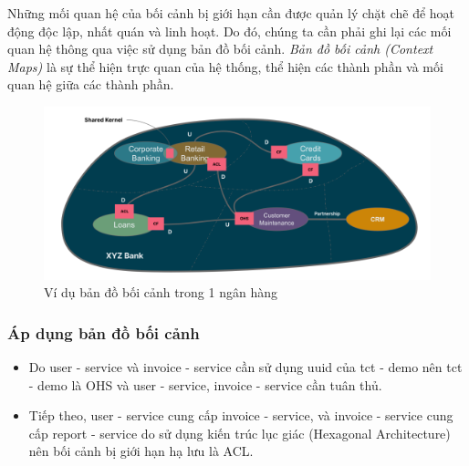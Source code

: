 Những mối quan hệ của bối cảnh bị giới hạn cần được quản lý chặt chẽ để hoạt động độc lập, nhất quán và linh hoạt. Do đó, chúng ta cần phải ghi lại các mối quan hệ thông qua việc sử dụng bản đồ bối cảnh. \emph{Bản đồ bối cảnh (Context Maps)} là sự thể hiện trực quan của hệ thống, thể hiện các thành phần và mối quan hệ giữa các thành phần.

\begin{figure}[H]

    \centering

    \includegraphics[scale = 0.4]{pictures/_vi_du_ban_do_boi_canh_trong_1_ngan_hang/main.drawio.png}

    \caption{Ví dụ bản đồ bối cảnh trong 1 ngân hàng}

\end{figure}

\subsubsection{Áp dụng bản đồ bối cảnh}    


\begin{itemize}
    \item   Do user - service    và invoice     -      service  cần sử dụng uuid của tct     -     demo nên tct     -     demo là OHS và user     -      service, invoice     -      service cần tuân thủ.


    \item    Tiếp theo, user     -      service    cung cấp  invoice     -      service, và invoice     -      service      cung cấp  report     -      service   do sử dụng kiến trúc lục giác (Hexagonal      Architecture) nên  bối cảnh bị giới hạn hạ lưu       là ACL.
\end{itemize}








